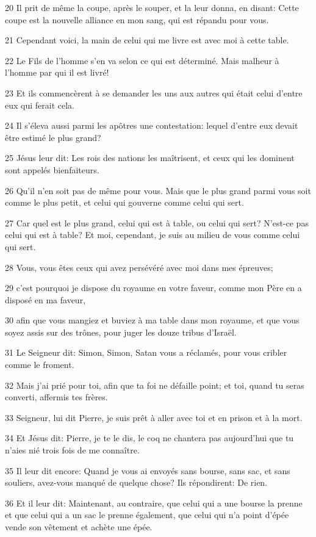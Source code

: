 \par 20 Il prit de même la coupe, après le souper, et la leur donna, en disant: Cette coupe est la nouvelle alliance en mon sang, qui est répandu pour vous.
\par 21 Cependant voici, la main de celui qui me livre est avec moi à cette table.
\par 22 Le Fils de l'homme s'en va selon ce qui est déterminé. Mais malheur à l'homme par qui il est livré!
\par 23 Et ils commencèrent à se demander les uns aux autres qui était celui d'entre eux qui ferait cela.
\par 24 Il s'éleva aussi parmi les apôtres une contestation: lequel d'entre eux devait être estimé le plus grand?
\par 25 Jésus leur dit: Les rois des nations les maîtrisent, et ceux qui les dominent sont appelés bienfaiteurs.
\par 26 Qu'il n'en soit pas de même pour vous. Mais que le plus grand parmi vous soit comme le plus petit, et celui qui gouverne comme celui qui sert.
\par 27 Car quel est le plus grand, celui qui est à table, ou celui qui sert? N'est-ce pas celui qui est à table? Et moi, cependant, je suis au milieu de vous comme celui qui sert.
\par 28 Vous, vous êtes ceux qui avez persévéré avec moi dans mes épreuves;
\par 29 c'est pourquoi je dispose du royaume en votre faveur, comme mon Père en a disposé en ma faveur,
\par 30 afin que vous mangiez et buviez à ma table dans mon royaume, et que vous soyez assis sur des trônes, pour juger les douze tribus d'Israël.
\par 31 Le Seigneur dit: Simon, Simon, Satan vous a réclamés, pour vous cribler comme le froment.
\par 32 Mais j'ai prié pour toi, afin que ta foi ne défaille point; et toi, quand tu seras converti, affermis tes frères.
\par 33 Seigneur, lui dit Pierre, je suis prêt à aller avec toi et en prison et à la mort.
\par 34 Et Jésus dit: Pierre, je te le dis, le coq ne chantera pas aujourd'hui que tu n'aies nié trois fois de me connaître.
\par 35 Il leur dit encore: Quand je vous ai envoyés sans bourse, sans sac, et sans souliers, avez-vous manqué de quelque chose? Ils répondirent: De rien.
\par 36 Et il leur dit: Maintenant, au contraire, que celui qui a une bourse la prenne et que celui qui a un sac le prenne également, que celui qui n'a point d'épée vende son vêtement et achète une épée.
